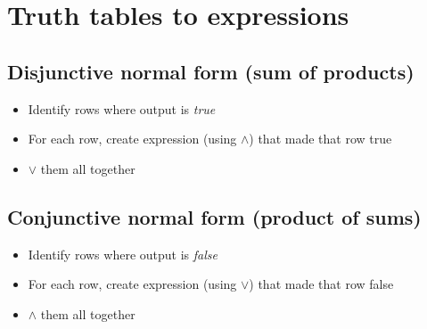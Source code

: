 \documentclass[12pt]{article}
\begin{document}
\section*{Truth tables to expressions}

\subsection*{Disjunctive normal form (sum of products)}

\begin{itemize}
    \item Identify rows where output is \emph{true}
    \item For each row, create expression (using $\land$) that made that row true
    \item $\lor$ them all together
\end{itemize}

\subsection*{Conjunctive normal form (product of sums)}

\begin{itemize}
    \item Identify rows where output is \emph{false}
    \item For each row, create expression (using $\lor$) that made that row false
    \item $\land$ them all together
\end{itemize}
\end{document}
